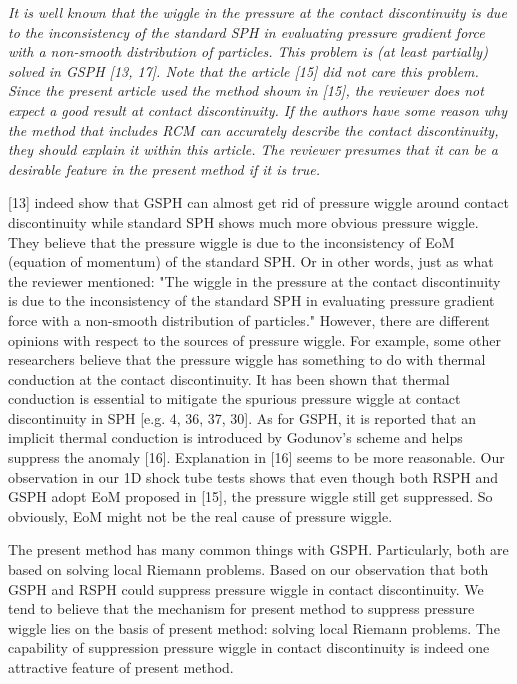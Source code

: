 \documentclass[10pt,a4paper]{article}
\begin{document}
\textit {It is well known that the wiggle in the pressure at the contact discontinuity is due to the inconsistency of the standard SPH in evaluating pressure gradient force with a non-smooth distribution of particles. This problem is (at least partially) solved in GSPH [13, 17]. Note that the article [15] did not care this problem. Since the present article used the method shown in [15], the reviewer does not expect a good result at contact discontinuity. If the authors have some reason why the method that includes RCM can accurately describe the contact discontinuity, they should explain it within this article. The reviewer
presumes that it can be a desirable feature in the present method if it is true.}

[13] indeed show that GSPH can almost get rid of pressure wiggle around contact discontinuity while standard SPH shows much more obvious pressure wiggle. They believe that the pressure wiggle is due to the inconsistency of EoM (equation of momentum) of the standard SPH. Or in other words, just as what the reviewer mentioned: "The wiggle in the pressure at the contact discontinuity is due to the inconsistency of the standard SPH in evaluating pressure gradient force with a non-smooth distribution of particles." However, there are different opinions with respect to the sources of pressure wiggle. For example, some other researchers believe that the pressure wiggle has something to do with thermal conduction at the contact discontinuity. It has been shown that thermal conduction is essential to mitigate the spurious pressure wiggle at contact discontinuity in SPH [e.g. 4, 36, 37, 30]. As for GSPH, it is reported that an implicit thermal conduction is introduced by Godunov's scheme and helps suppress the anomaly [16]. Explanation in [16] seems to be more reasonable. Our observation in our 1D shock tube tests shows that even though both RSPH and GSPH adopt EoM proposed in [15], the pressure wiggle still get suppressed. So obviously, EoM might not be the real cause of pressure wiggle. 

The present method has many common things with GSPH. Particularly, both are based on solving local Riemann problems. Based on our observation that both GSPH and RSPH could suppress pressure wiggle in contact discontinuity. We tend to believe that the mechanism for present method to suppress pressure wiggle lies on the basis of present method: solving local Riemann problems. 
The capability of suppression pressure wiggle in contact discontinuity is indeed one attractive feature of present method.
\end{document}
